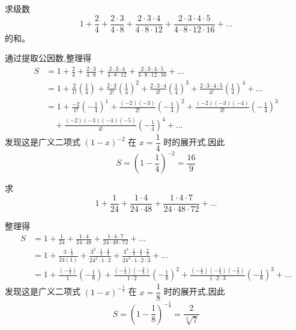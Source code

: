\begin{questions}
    \question 求级数 
    \[
    1 + \frac{2}{4} + \frac{2 \cdot 3}{4 \cdot 8} + \frac{2 \cdot 3 \cdot 4}{4 \cdot 8 \cdot 12} + \frac{2 \cdot 3 \cdot 4 \cdot 5}{4 \cdot 8 \cdot 12 \cdot 16} + \dots
    \]
    的和。
    \begin{solution}
        通过提取公因数,整理得
        \begin{align*}
        S &= 1 + \frac{2}{4} + \frac{2 \cdot 3}{4 \cdot 8} + \frac{2 \cdot 3 \cdot 4}{4 \cdot 8 \cdot 12} + \frac{2 \cdot 3 \cdot 4 \cdot 5}{4 \cdot 8 \cdot 12 \cdot 16} + \dots \\
        &= 1 + \frac{2}{1!}\left(\frac{1}{4}\right) + \frac{2 \cdot 3}{2!}\left(\frac{1}{4}\right)^2 + \frac{2 \cdot 3 \cdot 4}{3!}\left(\frac{1}{4}\right)^3 + \frac{2 \cdot 3 \cdot 4 \cdot 5}{4!}\left(\frac{1}{4}\right)^4 + \dots \\
        &= 1 + \frac{-2}{1!}\left(-\frac{1}{4}\right)^1 + \frac{(-2)(-3)}{2!}\left(-\frac{1}{4}\right)^2 + \frac{(-2)(-3)(-4)}{3!}\left(-\frac{1}{4}\right)^3 \\
        &\quad + \frac{(-2)(-3)(-4)(-5)}{4!}\left(-\frac{1}{4}\right)^4 + \dots
        \end{align*}
        发现这是广义二项式 $(1 - x)^{-2}$ 在 $x=\dfrac{1}{4}$ 时的展开式,因此
        \[
        S = \left(1 - \frac{1}{4}\right)^{-2} = \frac{16}{9}
        \]
    \end{solution}

    \question 求 
    \[
    1 + \frac{1}{24} + \frac{1 \cdot 4}{24 \cdot 48} + \frac{1 \cdot 4 \cdot 7}{24 \cdot 48 \cdot 72} + \dots
    \]
    \begin{solution}
        整理得
        \begin{align*}
        S &= 1 + \frac{1}{24} + \frac{1 \cdot 4}{24 \cdot 48} + \frac{1 \cdot 4 \cdot 7}{24 \cdot 48 \cdot 72} + \dots \\
        &= 1 + \frac{3\cdot\frac{1}{3}}{24(1)} + \frac{3^2\cdot\frac{1}{3} \cdot \frac{4}{3}}{24^2 \cdot 1 \cdot 2} + \frac{3^3\cdot\frac{1}{3} \cdot \frac{4}{3} \cdot \frac{7}{3}}{24^3 \cdot 1 \cdot 2 \cdot 3} + \dots \\
        &= 1 + \frac{\left(-\frac{1}{3}\right)}{1}\left(-\frac{1}{8}\right) + \frac{\left(-\frac{1}{3}\right)\left(-\frac{4}{3}\right)}{1 \cdot 2}\left(-\frac{1}{8}\right)^2 + \frac{\left(-\frac{1}{3}\right)\left(-\frac{4}{3}\right)\left(-\frac{7}{3}\right)}{1 \cdot 2 \cdot 3}\left(-\frac{1}{8}\right)^3 + \dots
        \end{align*}
        发现这是广义二项式 $(1 - x)^{-\frac{1}{3}}$ 在 $x=\dfrac{1}{8}$ 时的展开式,因此
        \[
        S = \left(1 - \frac{1}{8}\right)^{-\frac{1}{3}} = \frac{2}{\sqrt[3]{7}}
        \]
    \end{solution}


\end{questions}
